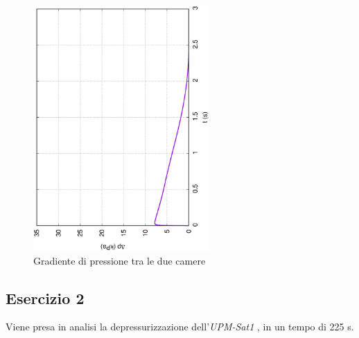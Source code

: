 \documentclass{article}
\begin{document}
        \begin{figure}[h!]
            \centering
            \label{fig:grad_cam_1}
            \includegraphics[width=0.6\textwidth, angle=-90]{MUL2/Esercitazione1/1C/Dp.eps}
            \caption{Gradiente di pressione tra le due camere}
        \end{figure}
        \clearpage

        \subsection{Esercizio 2\label{Es2}}

        Viene presa in analisi la depressurizzazione dell'\textit{UPM-Sat1} 
        \autocite{UPM_sat1}, in un tempo di 225 s. \\ 
\end{document}
